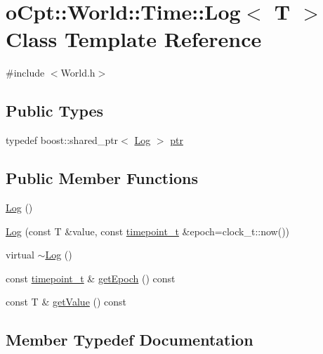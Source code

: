 \hypertarget{classo_cpt_1_1_world_1_1_time_1_1_log}{}\section{o\+Cpt\+:\+:World\+:\+:Time\+:\+:Log$<$ T $>$ Class Template Reference}
\label{classo_cpt_1_1_world_1_1_time_1_1_log}


{\ttfamily \#include $<$World.\+h$>$}

\subsection*{Public Types}
\begin{DoxyCompactItemize}
\item 
typedef boost\+::shared\+\_\+ptr$<$ \hyperlink{classo_cpt_1_1_world_1_1_time_1_1_log}{Log} $>$ \hyperlink{classo_cpt_1_1_world_1_1_time_1_1_log_ac60728a183e1d17aa602cdc78fe2a6f5}{ptr}
\end{DoxyCompactItemize}
\subsection*{Public Member Functions}
\begin{DoxyCompactItemize}
\item 
\hyperlink{classo_cpt_1_1_world_1_1_time_1_1_log_ac4bd19f2963c6f708a7578e4c23bf1d4}{Log} ()
\item 
\hyperlink{classo_cpt_1_1_world_1_1_time_1_1_log_aa404e83afcd8ab1f52d58cf4fb8c8972}{Log} (const T \&value, const \hyperlink{classo_cpt_1_1_world_1_1_time_a6a6e782c3c90622c1c7070b0a223ec4c}{timepoint\+\_\+t} \&epoch=clock\+\_\+t\+::now())
\item 
virtual \hyperlink{classo_cpt_1_1_world_1_1_time_1_1_log_a842b91ce3d76d1a4e0a95831944baca5}{$\sim$\+Log} ()
\item 
const \hyperlink{classo_cpt_1_1_world_1_1_time_a6a6e782c3c90622c1c7070b0a223ec4c}{timepoint\+\_\+t} \& \hyperlink{classo_cpt_1_1_world_1_1_time_1_1_log_a121392c9a6eb50e5cf960bab328e9a09}{get\+Epoch} () const 
\item 
const T \& \hyperlink{classo_cpt_1_1_world_1_1_time_1_1_log_a1ce2a278ff14252775564610ceaaa710}{get\+Value} () const 
\end{DoxyCompactItemize}


\subsection{Member Typedef Documentation}
